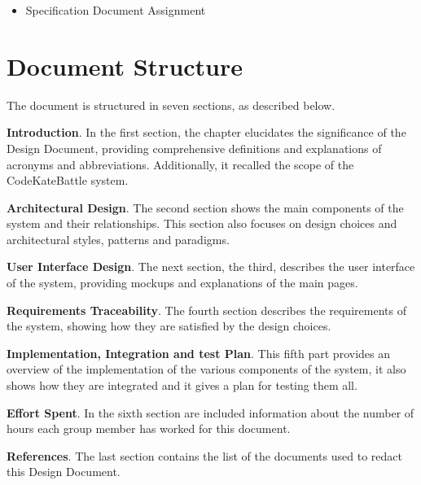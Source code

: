 \begin{itemize}
    \item Specification Document Assignment
\end{itemize}

\section{Document Structure}
\label{sec:doc_structure}%
The document is structured in seven sections, as described below.

\textbf{Introduction}. In the first section, the chapter elucidates the significance of the Design 
Document, providing comprehensive definitions and explanations of acronyms and abbreviations. Additionally, it recalled the scope of the CodeKateBattle system.

\textbf{Architectural Design}. The second section shows the main components of the system and their relationships. This section also focuses on design choices and architectural styles, patterns and paradigms.

\textbf{User Interface Design}. The next section, the third, describes the user interface of the system, providing mockups and explanations of the main pages.

\textbf{Requirements Traceability}. The fourth section describes the requirements of the system, showing how they are satisfied by the design choices.

\textbf{Implementation, Integration and test Plan}. This fifth part provides an overview of the implementation of the various components of the system, it also shows how they are integrated and it gives a plan for testing them all.

\textbf{Effort Spent}. In the sixth section are included information about the number of hours each group member has worked for this document.

\textbf{References}. The last section contains the list of the documents used to redact this Design Document.
 
